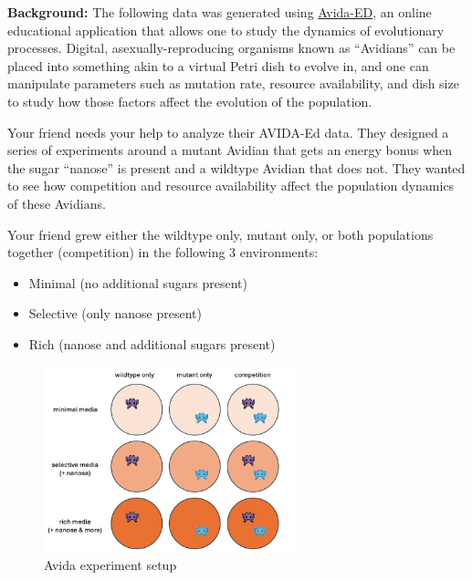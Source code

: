 \documentclass[
  letterpaper,
  DIV=11,
  numbers=noendperiod]{scrreprt}
\begin{document}
\textbf{Background:} The following data was generated using
\href{https://avida-ed.msu.edu/avida-ed-application/}{Avida-ED}, an
online educational application that allows one to study the dynamics of
evolutionary processes. Digital, asexually-reproducing organisms known
as ``Avidians'' can be placed into something akin to a virtual Petri
dish to evolve in, and one can manipulate parameters such as mutation
rate, resource availability, and dish size to study how those factors
affect the evolution of the population.

Your friend needs your help to analyze their AVIDA-Ed data. They
designed a series of experiments around a mutant Avidian that gets an
energy bonus when the sugar ``nanose'' is present and a wildtype Avidian
that does not. They wanted to see how competition and resource
availability affect the population dynamics of these Avidians.

Your friend grew either the wildtype only, mutant only, or both
populations together (competition) in the following 3 environments:

\begin{itemize}
\item
  Minimal (no additional sugars present)
\item
  Selective (only nanose present)
\item
  Rich (nanose and additional sugars present)
\end{itemize}

\begin{figure}

{\centering \includegraphics[width=0.65\textwidth,height=\textheight]{scripts/04_projects/project-day-2-files/figs/avida-expt.png}

}

\caption{Avida experiment setup}

\end{figure}
\end{document}
